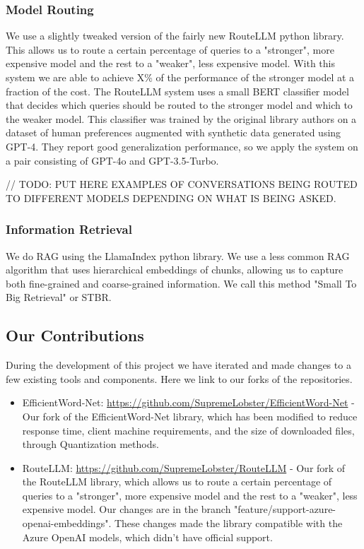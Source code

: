 \documentclass[a4paper,12pt,twoside]{ThesisStyle}
\begin{document}
\subsubsection{Model Routing}

We use a slightly tweaked version of the fairly new RouteLLM python library. This allows us to route a certain percentage of queries to a "stronger", more expensive model and the rest to a "weaker", less expensive model. With this system we are able to achieve X\% of the performance of the stronger model at a fraction of the cost. The RouteLLM system uses a small BERT classifier model that decides which queries should be routed to the stronger model and which to the weaker model. This classifier was trained by the original library authors on a dataset of human preferences augmented with synthetic data generated using GPT-4. They report good generalization performance, so we apply the system on a pair consisting of GPT-4o and GPT-3.5-Turbo.

// TODO: PUT HERE EXAMPLES OF CONVERSATIONS BEING ROUTED TO DIFFERENT MODELS DEPENDING ON WHAT IS BEING ASKED.


\subsubsection{Information Retrieval}

We do RAG using the LlamaIndex python library. We use a less common RAG algorithm that uses hierarchical embeddings of chunks, allowing us to capture both fine-grained and coarse-grained information. We call this method "Small To Big Retrieval" or STBR.

\subsection{Our Contributions}
During the development of this project we have iterated and made changes to a few existing tools and components. Here we link to our forks of the repositories.

\begin{itemize}
  \item EfficientWord-Net: \url{https://github.com/SupremeLobster/EfficientWord-Net} - Our fork of the EfficientWord-Net library, which has been modified to reduce response time, client machine requirements, and the size of downloaded files, through Quantization methods.
  \item RouteLLM: \url{https://github.com/SupremeLobster/RouteLLM} - Our fork of the RouteLLM library, which allows us to route a certain percentage of queries to a "stronger", more expensive model and the rest to a "weaker", less expensive model. Our changes are in the branch "feature/support-azure-openai-embeddings". These changes made the library compatible with the Azure OpenAI models, which didn't have official support.
\end{itemize}
\end{document}
